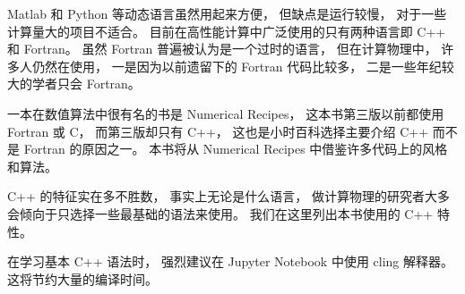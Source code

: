 
Matlab 和 Python 等动态语言虽然用起来方便， 但缺点是运行较慢， 对于一些计算量大的项目不适合。 目前在高性能计算中广泛使用的只有两种语言即 C++ 和 Fortran。 虽然 Fortran 普遍被认为是一个过时的语言， 但在计算物理中， 许多人仍然在使用， 一是因为以前遗留下的 Fortran 代码比较多， 二是一些年纪较大的学者只会 Fortran。

一本在数值算法中很有名的书是 Numerical Recipes， 这本书第三版以前都使用 Fortran 或 C， 而第三版却只有 C++， 这也是小时百科选择主要介绍 C++ 而不是 Fortran 的原因之一。 本书将从 Numerical Recipes 中借鉴许多代码上的风格和算法。

C++ 的特征实在多不胜数， 事实上无论是什么语言， 做计算物理的研究者大多会倾向于只选择一些最基础的语法来使用。
我们在这里列出本书使用的 C++ 特性。

在学习基本 C++ 语法时， 强烈建议在 Jupyter Notebook 中使用 cling 解释器。 这将节约大量的编译时间。

